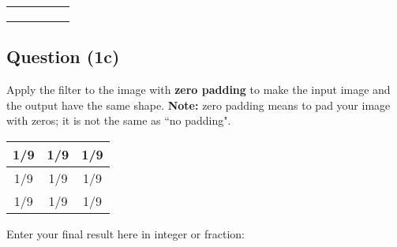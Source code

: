 \documentclass[12pt]{article}
\begin{document}
\begin{center}
\begin{tabular}{|l|l|l|l|l|}
\hline
\hspace{1mm} & \hspace{1mm} & \hspace{1mm} & \hspace{1mm} & \hspace{1mm} \\ \hline
\hspace{1mm} & \hspace{1mm} & \hspace{1mm} & \hspace{1mm} & \hspace{1mm} \\ \hline
\hspace{1mm} & \hspace{1mm} & \hspace{1mm} & \hspace{1mm} & \hspace{1mm} \\ \hline
\hspace{1mm} & \hspace{1mm} & \hspace{1mm} & \hspace{1mm} & \hspace{1mm} \\ \hline
\end{tabular}
\end{center}

\newpage

\subsection*{Question (1c)} Apply the filter to the image with \textbf{zero padding} to make the input image and the output have the same shape. \textbf{Note:} zero padding means to pad your image with zeros; it is not the same as ``no padding".
\begin{center}
\begin{tabular}{|c|c|c|}
\hline
1/9  & 1/9 & 1/9 \\ \hline
1/9  & 1/9 & 1/9 \\ \hline
1/9  & 1/9 & 1/9 \\ \hline
\end{tabular}
\end{center}

\noindent Enter your final result here in integer or fraction:
\end{document}
